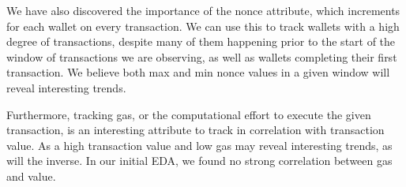 \documentclass[sigconf]{acmart}
\begin{document}
We have also discovered the importance of the nonce attribute, which increments for each wallet on every transaction. We can use this to track wallets with a high degree of transactions, despite many of them happening prior to the start of the window of transactions we are observing, as well as wallets completing their first transaction. We believe both max and min nonce values in a given window will reveal interesting trends.

Furthermore, tracking gas, or the computational effort to execute the given transaction, is an interesting attribute to track in correlation with transaction value. As a high transaction value and low gas may reveal interesting trends, as will the inverse. In our initial EDA, we found no strong correlation between gas and value.

 
\end{document}
